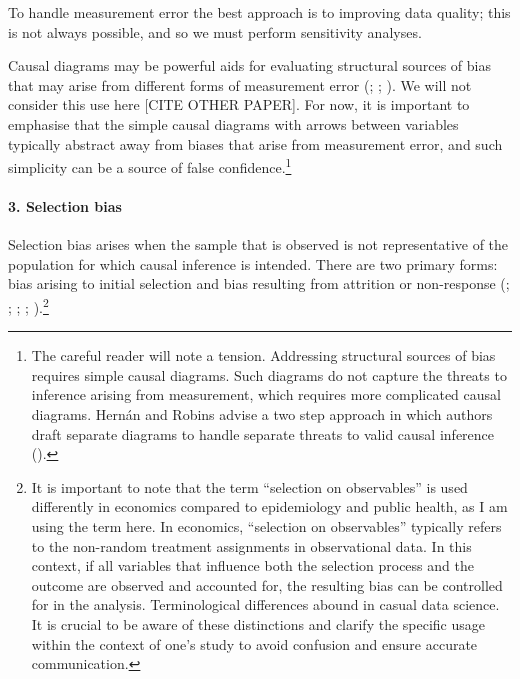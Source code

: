 \documentclass[
  singlecolumn,
  9pt]{article}
\let\oldparagraph\paragraph
\renewcommand{\paragraph}[1]{\oldparagraph{#1}\mbox{}}
\begin{document}
To handle measurement error the best approach is to improving data
quality; this is not always possible, and so we must perform sensitivity
analyses.

Causal diagrams may be powerful aids for evaluating structural sources
of bias that may arise from different forms of measurement error
(;
;
). We will
not consider this use here {[}CITE OTHER PAPER{]}. For now, it is
important to emphasise that the simple causal diagrams with arrows
between variables typically abstract away from biases that arise from
measurement error, and such simplicity can be a source of false
confidence.\footnote{The careful reader will note a tension. Addressing
  structural sources of bias requires simple causal diagrams. Such
  diagrams do not capture the threats to inference arising from
  measurement, which requires more complicated causal diagrams. Hernán
  and Robins advise a two step approach in which authors draft separate
  diagrams to handle separate threats to valid causal inference
  ().}

\paragraph{3. Selection bias}\label{selection-bias}

Selection bias arises when the sample that is observed is not
representative of the population for which causal inference is intended.
There are two primary forms: bias arising to initial selection and bias
resulting from attrition or non-response
(;
;
; ; ).\footnote{It is important to note that the term ``selection on
  observables'' is used differently in economics compared to
  epidemiology and public health, as I am using the term here. In
  economics, ``selection on observables'' typically refers to the
  non-random treatment assignments in observational data. In this
  context, if all variables that influence both the selection process
  and the outcome are observed and accounted for, the resulting bias can
  be controlled for in the analysis. Terminological differences abound
  in casual data science. It is crucial to be aware of these
  distinctions and clarify the specific usage within the context of
  one's study to avoid confusion and ensure accurate communication.}
\end{document}
